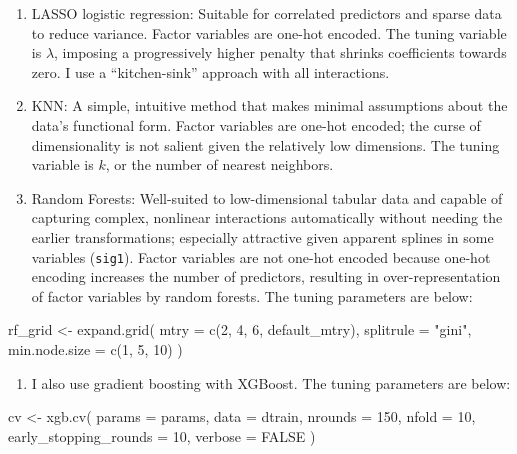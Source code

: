 \documentclass[
]{article}
\newenvironment{Shaded}{\begin{snugshade}}{\end{snugshade}}
\newcommand{\AttributeTok}[1]{\textcolor[rgb]{0.40,0.45,0.13}{#1}}
\newcommand{\ConstantTok}[1]{\textcolor[rgb]{0.56,0.35,0.01}{#1}}
\newcommand{\DecValTok}[1]{\textcolor[rgb]{0.68,0.00,0.00}{#1}}
\newcommand{\FunctionTok}[1]{\textcolor[rgb]{0.28,0.35,0.67}{#1}}
\newcommand{\NormalTok}[1]{\textcolor[rgb]{0.00,0.23,0.31}{#1}}
\newcommand{\OtherTok}[1]{\textcolor[rgb]{0.00,0.23,0.31}{#1}}
\newcommand{\StringTok}[1]{\textcolor[rgb]{0.13,0.47,0.30}{#1}}
\providecommand{\tightlist}{%
  \setlength{\itemsep}{0pt}\setlength{\parskip}{0pt}}
\begin{document}
\begin{enumerate}
\def\labelenumi{\arabic{enumi}.}
\tightlist
\item
  LASSO logistic regression: Suitable for correlated predictors and
  sparse data to reduce variance. Factor variables are one-hot encoded.
  The tuning variable is \(\lambda\), imposing a progressively higher
  penalty that shrinks coefficients towards zero. I use a
  ``kitchen-sink'' approach with all interactions.
\item
  KNN: A simple, intuitive method that makes minimal assumptions about
  the data's functional form. Factor variables are one-hot encoded; the
  curse of dimensionality is not salient given the relatively low
  dimensions. The tuning variable is \(k\), or the number of nearest
  neighbors.
\item
  Random Forests: Well-suited to low-dimensional tabular data and
  capable of capturing complex, nonlinear interactions automatically
  without needing the earlier transformations; especially attractive
  given apparent splines in some variables (\texttt{sig1}). Factor
  variables are not one-hot encoded because one-hot encoding increases
  the number of predictors, resulting in over-representation of factor
  variables by random forests. The tuning parameters are below:
\end{enumerate}

\begin{Shaded}
\begin{Highlighting}[]
\NormalTok{rf\_grid }\OtherTok{\textless{}{-}} \FunctionTok{expand.grid}\NormalTok{(}
  \AttributeTok{mtry =} \FunctionTok{c}\NormalTok{(}\DecValTok{2}\NormalTok{, }\DecValTok{4}\NormalTok{, }\DecValTok{6}\NormalTok{, default\_mtry),}
  \AttributeTok{splitrule =} \StringTok{"gini"}\NormalTok{,}
  \AttributeTok{min.node.size =} \FunctionTok{c}\NormalTok{(}\DecValTok{1}\NormalTok{, }\DecValTok{5}\NormalTok{, }\DecValTok{10}\NormalTok{)}
\NormalTok{)}
\end{Highlighting}
\end{Shaded}

\begin{enumerate}
\def\labelenumi{\arabic{enumi}.}
\setcounter{enumi}{3}
\tightlist
\item
  I also use gradient boosting with XGBoost. The tuning parameters are
  below:
\end{enumerate}

\begin{Shaded}
\begin{Highlighting}[]
\NormalTok{cv }\OtherTok{\textless{}{-}} \FunctionTok{xgb.cv}\NormalTok{(}
  \AttributeTok{params =}\NormalTok{ params,}
  \AttributeTok{data =}\NormalTok{ dtrain,}
  \AttributeTok{nrounds =} \DecValTok{150}\NormalTok{,}
  \AttributeTok{nfold =} \DecValTok{10}\NormalTok{,}
  \AttributeTok{early\_stopping\_rounds =} \DecValTok{10}\NormalTok{,}
  \AttributeTok{verbose =} \ConstantTok{FALSE}
\NormalTok{)}
\end{Highlighting}
\end{Shaded}
\end{document}
